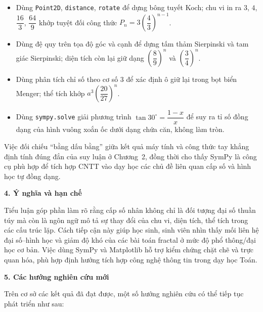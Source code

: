 \documentclass[12pt,a4paper,oneside]{book}
\theoremstyle{theorem}
\theoremstyle{definition}
\begin{document}
\begin{itemize}[leftmargin=1.5em, itemsep=3pt]
  \item Dùng \texttt{Point2D}, \texttt{distance}, \texttt{rotate} để dựng bông tuyết Koch; chu vi in ra $3$, $4$, $\dfrac{16}{3}$, $\dfrac{64}{9}$ khớp tuyệt đối công thức $P_n=3\left(\dfrac{4}{3}\right)^{n-1}$.
  \item Dùng đệ quy trên tọa độ góc và cạnh để dựng tấm thảm Sierpinski và tam giác Sierpinski; diện tích còn lại giữ dạng $\left(\dfrac{8}{9}\right)^n$ và $\left(\dfrac{3}{4}\right)^n$.
  \item Dùng phân tích chỉ số theo cơ số $3$ để xác định ô giữ lại trong bọt biển Menger; thể tích khớp $a^3\left(\dfrac{20}{27}\right)^n$.
  \item Dùng \texttt{sympy.solve} giải phương trình $\tan 30^\circ=\dfrac{1-x}{x}$ để suy ra tỉ số đồng dạng của hình vuông xoắn ốc dưới dạng chứa căn, không làm tròn.
\end{itemize}

Việc đối chiếu ``bằng dấu bằng'' giữa kết quả máy tính và công thức tay khẳng định tính đúng đắn của suy luận ở Chương~2, đồng thời cho thấy SymPy là công cụ phù hợp để tích hợp CNTT vào dạy học các chủ đề liên quan cấp số và hình học tự đồng dạng.

\vspace{0.4em}
\noindent\textbf{4. Ý nghĩa và hạn chế}

Tiểu luận góp phần làm rõ rằng cấp số nhân không chỉ là đối tượng đại số thuần túy mà còn là ngôn ngữ mô tả sự thay đổi của chu vi, diện tích, thể tích trong các cấu trúc lặp. Cách tiếp cận này giúp học sinh, sinh viên nhìn thấy mối liên hệ đại số--hình học và giảm độ khó của các bài toán fractal ở mức độ phổ thông/đại học cơ bản. Việc dùng SymPy và Matplotlib hỗ trợ kiểm chứng chặt chẽ và trực quan hóa, phù hợp định hướng tích hợp công nghệ thông tin trong dạy học Toán.

\vspace{0.4em}
\noindent\textbf{5. Các hướng nghiên cứu mới}

Trên cơ sở các kết quả đã đạt được, một số hướng nghiên cứu có thể tiếp tục phát triển như sau:
\end{document}
